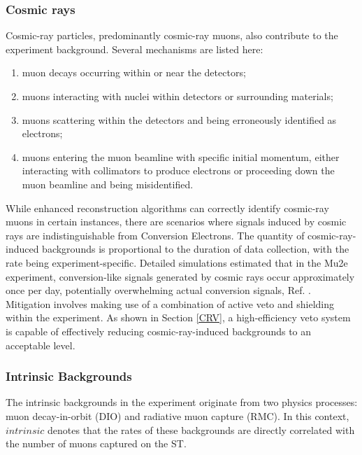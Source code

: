 \subsubsection{Cosmic rays}
Cosmic-ray particles, predominantly cosmic-ray muons, also contribute to the experiment 
background. Several mechanisms are listed here:
\begin{enumerate}
    \item muon decays occurring within or near the detectors;
    \item muons interacting with nuclei within detectors or surrounding materials;
    \item muons scattering within the detectors and being erroneously identified as electrons;
    \item muons entering the muon beamline with specific initial momentum, either 
    interacting with collimators to produce electrons or proceeding down the muon 
    beamline and being misidentified.
\end{enumerate}

While enhanced reconstruction algorithms can correctly identify cosmic-ray muons in 
certain instances, there are scenarios where signals induced by cosmic rays are 
indistinguishable from Conversion Electrons. The quantity of cosmic-ray-induced 
backgrounds is proportional to the duration of data collection, with the rate being 
experiment-specific. Detailed simulations estimated that in the Mu2e experiment, 
conversion-like signals generated by cosmic rays occur approximately once per day, 
potentially overwhelming actual conversion signals, Ref. \cite{CRVposter}. Mitigation 
involves making use of a combination of active veto and shielding within the experiment. 
As shown in Section \ref{CRV}, a high-efficiency veto system is capable of effectively 
reducing cosmic-ray-induced backgrounds to an acceptable level.
\subsubsection{Intrinsic Backgrounds}
The intrinsic backgrounds in the experiment originate from two physics processes: 
muon decay-in-orbit (DIO) and radiative muon capture (RMC). In this context, 
$intrinsic$ denotes that the rates of these backgrounds are directly correlated 
with the number of muons captured on the ST.

